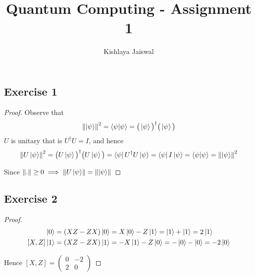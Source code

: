\documentclass{article}
\title{Quantum Computing - Assignment 1}
\author{Kishlaya Jaiswal}
\newcommand{\norm}[1]{\left\lVert#1\right\rVert}
\begin{document}
\maketitle


\subsection*{Exercise 1}
\begin{proof}
Observe that
$$\norm{ \ket{\psi} }^2 = \braket{\psi|\psi} = \big(\ket{\psi}\big)^{\dag} \big(\ket{\psi}\big)$$
$U$ is unitary that is $U^{\dag} U = I$, and hence
$$\norm{ U\ket{\psi} }^2 = \big(U\ket{\psi}\big)^{\dag} \big(U\ket{\psi}\big) = \bra{\psi} U^\dag U \ket{\psi} = \bra{\psi} I \ket{\psi} = \braket{\psi|\psi} = \norm{ \ket{\psi} }^2$$

Since $\norm{.} \geq 0 \implies \norm{ U\ket{\psi} } = \norm{ \ket{\psi} }$
\end{proof}


\subsection*{Exercise 2}
\begin{proof}
\begin{align*}
    [X,Z] \ket{0} &= (XZ-ZX) \ket{0} = X\ket{0} - Z\ket{1} = \ket{1} + \ket{1} = 2 \ket{1} \\
    [X,Z] \ket{1} &= (XZ-ZX) \ket{1} = -X\ket{1} - Z\ket{0} = -\ket{0} - \ket{0} = -2 \ket{0}
\end{align*}

Hence $[X,Z] = \begin{pmatrix} 0 & -2 \\ 2 & 0\end{pmatrix}$
\end{proof}
\end{document}
